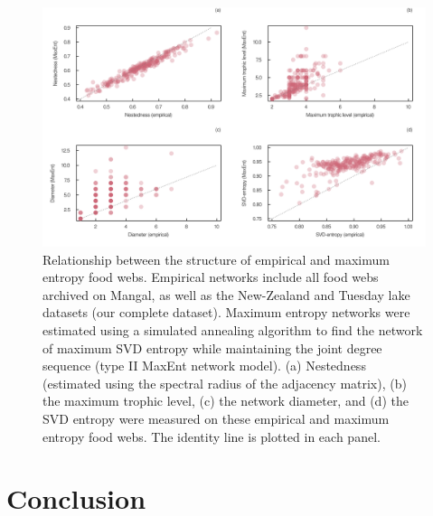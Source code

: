 \documentclass[11pt]{article}
\makeatletter
\def\maxwidth{\ifdim\Gin@nat@width>\linewidth\linewidth
\else\Gin@nat@width\fi}
\let\Oldincludegraphics\includegraphics
\renewcommand{\includegraphics}[1]{\Oldincludegraphics[width=\maxwidth]{#1}}
\makeatother
\begin{document}
\begin{figure}
\hypertarget{fig:measures}{%
\centering
\includegraphics{figures/measures_emp_maxent.png}
\caption{Relationship between the structure of empirical and maximum
entropy food webs. Empirical networks include all food webs archived on
Mangal, as well as the New-Zealand and Tuesday lake datasets (our
complete dataset). Maximum entropy networks were estimated using a
simulated annealing algorithm to find the network of maximum SVD entropy
while maintaining the joint degree sequence (type II MaxEnt network
model). (a) Nestedness (estimated using the spectral radius of the
adjacency matrix), (b) the maximum trophic level, (c) the network
diameter, and (d) the SVD entropy were measured on these empirical and
maximum entropy food webs. The identity line is plotted in each
panel.}\label{fig:measures}
}
\end{figure}

\hypertarget{conclusion}{%
\section{Conclusion}\label{conclusion}}
\end{document}
